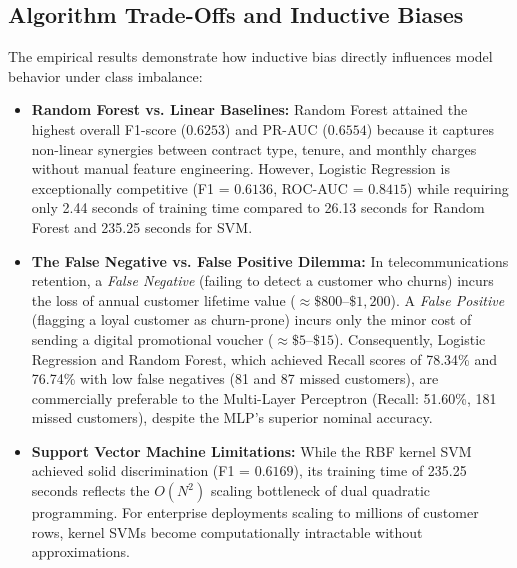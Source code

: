 \subsection{Algorithm Trade-Offs and Inductive Biases}
The empirical results demonstrate how inductive bias directly influences model behavior under class imbalance:
\begin{itemize}
    \item \textbf{Random Forest vs. Linear Baselines:} Random Forest attained the highest overall F1-score ($0.6253$) and PR-AUC ($0.6554$) because it captures non-linear synergies between contract type, tenure, and monthly charges without manual feature engineering. However, Logistic Regression is exceptionally competitive (F1 = $0.6136$, ROC-AUC = $0.8415$) while requiring only 2.44 seconds of training time compared to 26.13 seconds for Random Forest and 235.25 seconds for SVM.
    \item \textbf{The False Negative vs. False Positive Dilemma:} In telecommunications retention, a \textit{False Negative} (failing to detect a customer who churns) incurs the loss of annual customer lifetime value ($\approx \$800$--$\$1,200$). A \textit{False Positive} (flagging a loyal customer as churn-prone) incurs only the minor cost of sending a digital promotional voucher ($\approx \$5$--$\$15$). Consequently, Logistic Regression and Random Forest, which achieved Recall scores of 78.34\% and 76.74\% with low false negatives (81 and 87 missed customers), are commercially preferable to the Multi-Layer Perceptron (Recall: 51.60\%, 181 missed customers), despite the MLP's superior nominal accuracy.
    \item \textbf{Support Vector Machine Limitations:} While the RBF kernel SVM achieved solid discrimination (F1 = $0.6169$), its training time of 235.25 seconds reflects the $O(N^2)$ scaling bottleneck of dual quadratic programming. For enterprise deployments scaling to millions of customer rows, kernel SVMs become computationally intractable without approximations.
\end{itemize}

